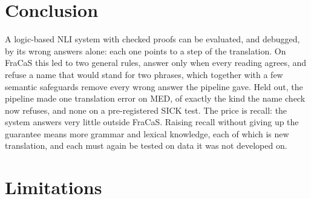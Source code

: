 \documentclass[11pt]{article}
\begin{document}
\section{Conclusion}

A logic-based NLI system with checked proofs can be evaluated, and
debugged, by its wrong answers alone: each one points to a step of the
translation. On FraCaS this led to two general rules, answer only when
every reading agrees, and refuse a name that would stand for two
phrases, which together with a few semantic safeguards remove every
wrong answer the pipeline gave. Held out, the pipeline made one
translation error on MED, of exactly the kind the name check now
refuses, and none on a pre-registered SICK test. The price is recall:
the system answers very little outside FraCaS. Raising recall without
giving up the guarantee means more grammar and lexical knowledge, each
of which is new translation, and each must again be tested on data it
was not developed on.

\section*{Limitations}
\end{document}
